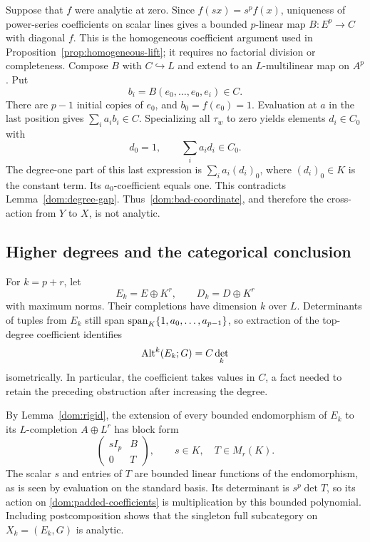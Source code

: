 Suppose that $f$ were analytic at zero. Since $f(sx)=s^pf(x)$, uniqueness of power-series coefficients
on scalar lines gives a bounded $p$\nobreakdash-linear map $B\colon E^p\to C$ with diagonal $f$.
This is the homogeneous coefficient argument used in Proposition~\ref{prop:homogeneous-lift}; it requires no factorial
division or completeness. Compose $B$ with $C\hookrightarrow L$ and extend to an $L$\nobreakdash-multilinear
map on $A^p$. Put
\[
b_i=B(e_0,\ldots,e_0,e_i)\in C.
\]
There are $p-1$ initial copies of $e_0$, and $b_0=f(e_0)=1$. Evaluation at $a$ in the last position gives
$\sum_i a_i b_i\in C$. Specializing all $\tau_w$ to zero yields elements $d_i\in C_0$ with
\[
d_0=1,\qquad \sum_i a_i d_i\in C_0.
\]
The degree-one part of this last expression is $\sum_i a_i(d_i)_0$, where $(d_i)_0\in K$ is the
constant term. Its $a_0$\nobreakdash-coefficient equals one. This contradicts Lemma~\ref{dom:degree-gap}.
Thus~\eqref{dom:bad-coordinate}, and therefore the cross-action from $Y$ to $X$, is not analytic.

\subsection{Higher degrees and the categorical conclusion}

For $k=p+r$, let
\[
E_k=E\oplus K^r,\qquad D_k=D\oplus K^r
\]
with maximum norms. Their completions have dimension $k$ over $L$. Determinants of tuples from $E_k$
still span $\operatorname{span}_K\{1,a_0,\ldots,a_{p-1}\}$, so extraction of the top-degree coefficient identifies
\begin{equation}\label{dom:padded-coefficients}
\operatorname{Alt}^k(E_k;G)=C\det_k
\end{equation}
isometrically. In particular, the coefficient takes values in $C$, a fact needed to retain the preceding
obstruction after increasing the degree.

By Lemma~\ref{dom:rigid}, the extension of every bounded endomorphism of $E_k$ to its
$L$\nobreakdash-completion $A\oplus L^r$ has block form
\[
\begin{pmatrix}sI_p&B\\0&T\end{pmatrix},\qquad s\in K,\quad T\in M_r(K).
\]
The scalar $s$ and entries of $T$ are bounded linear functions of the endomorphism, as is seen by
evaluation on the standard basis. Its determinant is $s^p\det T$, so its action on
\eqref{dom:padded-coefficients} is multiplication by this bounded polynomial. Including postcomposition
shows that the singleton full subcategory on $X_k=(E_k,G)$ is analytic.

